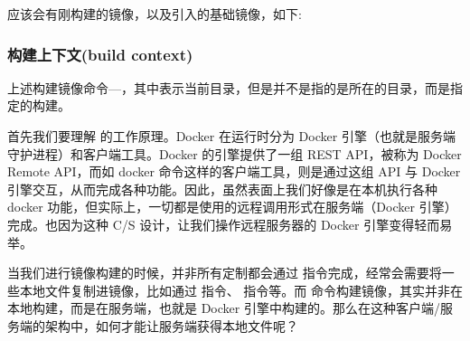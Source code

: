 \documentclass[letterpaper,10pt,english]{sphinxmanual}
\begin{document}
\begin{itemize}
\begin{sphinxVerbatim}[commandchars=\\\{\}]
  
\end{sphinxVerbatim}

应该会有刚构建的镜像，以及引入的基础镜像，如下:

\begin{sphinxVerbatim}[commandchars=\\\{\}]
                                                                                 
                                                                        
                                                                             
\end{sphinxVerbatim}

\end{itemize}


\subsubsection{构建上下文(build context)}
\label{\detokenize{docker/practice:build-context}}
上述构建镜像命令—，其中表示当前目录，但是并不是指的是所在的目录，而是指定的构建。

首先我们要理解  的工作原理。Docker 在运行时分为 Docker 引擎（也就是服务端守护进程）和客户端工具。Docker 的引擎提供了一组 REST API，被称为 Docker Remote API，而如 docker 命令这样的客户端工具，则是通过这组 API 与 Docker 引擎交互，从而完成各种功能。因此，虽然表面上我们好像是在本机执行各种 docker 功能，但实际上，一切都是使用的远程调用形式在服务端（Docker 引擎）完成。也因为这种 C/S 设计，让我们操作远程服务器的 Docker 引擎变得轻而易举。

当我们进行镜像构建的时候，并非所有定制都会通过  指令完成，经常会需要将一些本地文件复制进镜像，比如通过  指令、 指令等。而  命令构建镜像，其实并非在本地构建，而是在服务端，也就是 Docker 引擎中构建的。那么在这种客户端/服务端的架构中，如何才能让服务端获得本地文件呢？
\end{document}
